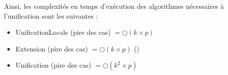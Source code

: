 Ainsi, les complexités en temps d'exécution des algorithmes nécessaires à l'unification 
sont les suivantes :
\begin{itemize}
	\item UnificationLocale (pire des cas) $= \bigcirc(k \times p)$
	\item Extension (pire des cas) $= \bigcirc(k \times p)$ (\cite{algorithmique})
	\item Unification (pire des cas) $= \bigcirc(k^{2} \times p)$
\end{itemize}










